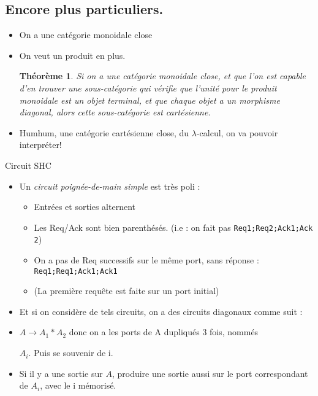 \documentclass{beamer}
\newtheorem{theo}[theorem]{Théorème}
\begin{document}
\subsection{Encore plus particuliers.}
\begin{frame}
\begin{itemize}
\item On a une catégorie monoidale close
\pause
\item On veut un produit en plus.
\pause
\begin{theo}
Si on a une catégorie monoidale close, et que l'on est capable d'en trouver une
sous-catégorie qui vérifie que l'unité pour le produit monoidale est un objet
terminal, et que chaque objet a un morphisme diagonal, alors cette
sous-catégorie est cartésienne.
\end{theo}
\pause
\item Humhum, une catégorie cartésienne close, du $\lambda$-calcul, on va
pouvoir interpréter!
\end{itemize}
\end{frame}

\begin{frame}{Circuit SHC}
\begin{itemize}
\item Un \emph{circuit poignée-de-main simple} est \pause très poli :
\pause
\begin{itemize}
\item Entrées et sorties alternent
\item Les Req/Ack sont bien parenthésés. (i.e : on fait pas \texttt{Req1;Req2;Ack1;Ack
2})
\item On a pas de Req successifs sur le même port, sans réponse :
\texttt{Req1;Req1;Ack1;Ack1}
\pause
\item (La première requête est faite sur un port initial) 
\end{itemize}
\end{itemize}
\end{frame}

\begin{frame}
\begin{itemize}
\item Et si on considère de tels circuits, on a des circuits diagonaux comme
suit : 
\pause
\item $A \rightarrow A_1*A_2$ donc on a les ports de A dupliqués 3 fois, nommés

$A_i$. Puis se souvenir de i.
\item Si il y a une sortie sur $A$, produire une sortie aussi sur le port
correspondant de $A_i$, avec le i mémorisé.
\end{itemize}
\end{frame}
\end{document}
